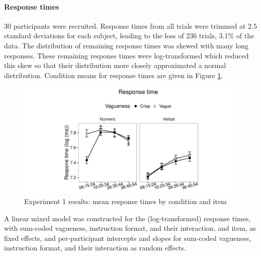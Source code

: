 \paragraph{\textbf{Response times}}

30 participants were recruited. Response times from all trials were trimmed at 2.5 standard deviations for each subject, leading to the loss of 236 trials, 3.1\% of the data. The distribution of remaining response times was skewed with many long responses. These remaining response times were log-transformed which reduced this skew so that their distribution more closely approximated a normal distribution. Condition means for response times are given in Figure \ref{resultsC-exp-1-RT}. 

\begin{figure}[htbp]
\centering
\includegraphics[width=\textwidth]{figures/Ce1-rtplot-1.pdf}
\caption{Experiment 1 results: mean response times by condition and item}
\label{resultsC-exp-1-RT}
\end{figure}

A linear mixed model was constructed for the (log-transformed) response times, with sum-coded vagueness, instruction format, and their interaction, and item, as fixed effects, and per-participant intercepts and slopes for sum-coded vagueness, instruction format, and their interaction as random effects. 

